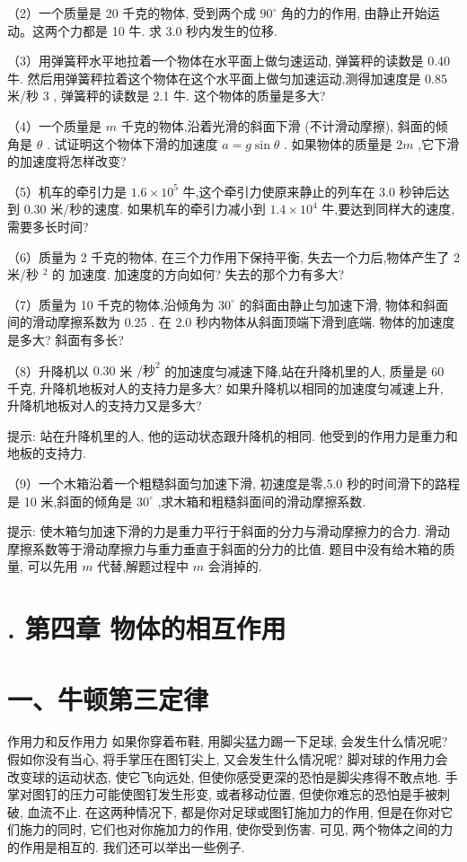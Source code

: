 \documentclass[10pt]{article}
\begin{document}
（2）一个质量是 20 千克的物体, 受到两个成 \({90}^{ \circ }\) 角的力的作用, 由静止开始运动。这两个力都是 10 牛. 求 3.0 秒内发生的位移.

（3）用弹簧秤水平地拉着一个物体在水平面上做匀速运动, 弹簧秤的读数是 0.40 牛. 然后用弹簧秤拉着这个物体在这个水平面上做匀加速运动,测得加速度是 0.85 米/秒 3 , 弹簧秤的读数是 2.1 牛. 这个物体的质量是多大?

（4）一个质量是 \(m\) 千克的物体,沿着光滑的斜面下滑 (不计滑动摩擦), 斜面的倾角是 \(\theta\) . 试证明这个物体下滑的加速度 \(a = g\sin \theta\) . 如果物体的质量是 \({2m}\) ,它下滑的加速度将怎样改变?

（5）机车的牵引力是 \({1.6} \times {10}^{5}\) 牛,这个牵引力使原来静止的列车在 3.0 秒钟后达到 0.30 米/秒的速度. 如果机车的牵引力减小到 \({1.4} \times {10}^{4}\) 牛,要达到同样大的速度,需要多长时间?

（6）质量为 2 千克的物体, 在三个力作用下保持平衡, 失去一个力后,物体产生了 2 米/秒 \({}^{2}\) 的 加速度. 加速度的方向如何? 失去的那个力有多大?

（7）质量为 10 千克的物体,沿倾角为 \({30}^{ \circ }\) 的斜面由静止匀加速下滑, 物体和斜面间的滑动摩擦系数为 0.25 . 在 2.0 秒内物体从斜面顶端下滑到底端. 物体的加速度是多大? 斜面有多长?

（8）升降机以 \({0.30}\) 米 \(/{\text{秒}}^{2}\) 的加速度匀减速下降,站在升降机里的人, 质量是 60 千克, 升降机地板对人的支持力是多大? 如果升降机以相同的加速度匀减速上升, 升降机地板对人的支持力又是多大?

提示: 站在升降机里的人, 他的运动状态跟升降机的相同. 他受到的作用力是重力和地板的支持力.

（9）一个木箱沿着一个粗糙斜面匀加速下滑, 初速度是零,5.0 秒的时间滑下的路程是 10 米,斜面的倾角是 \({30}^{ \circ }\) ,求木箱和粗糙斜面间的滑动摩擦系数.

提示: 使木箱匀加速下滑的力是重力平行于斜面的分力与滑动摩擦力的合力. 滑动摩擦系数等于滑动摩擦力与重力垂直于斜面的分力的比值. 题目中没有给木箱的质量, 可以先用 \(m\) 代替,解题过程中 \(m\) 会消掉的.

\section*{. 第四章 物体的相互作用}

\section*{一、牛顿第三定律}

作用力和反作用力 如果你穿着布鞋, 用脚尖猛力踢一下足球, 会发生什么情况呢? 假如你没有当心, 将手掌压在图钉尖上, 又会发生什么情况呢? 脚对球的作用力会改变球的运动状态, 使它飞向远处, 但使你感受更深的恐怕是脚尖疼得不敢点地. 手掌对图钉的压力可能使图钉发生形变, 或者移动位置, 但使你难忘的恐怕是手被刺破, 血流不止. 在这两种情况下, 都是你对足球或图钉施加力的作用, 但是在你对它们施力的同时, 它们也对你施加力的作用, 使你受到伤害. 可见, 两个物体之间的力的作用是相互的. 我们还可以举出一些例子.
\end{document}
